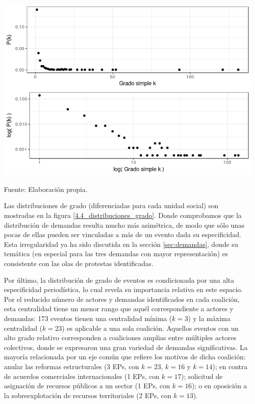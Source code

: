 \documentclass[letterpaper, 11pt]{book}
\theoremstyle{definition}
\theoremstyle{remark}
\begin{document}
\begin{minipage}{\linewidth}
\centering
{} \label{4.3_grado_actores}
\hspace{-1em}\includegraphics[scale=0.75]{img/4.3_grado_actores.png}
\par
\small Fuente: Elaboración propia.
\end{minipage}\bigskip


Las distribuciones de grado (diferenciadas para cada unidad social) son mostradas en la figura \ref{4.4_distribuciones_grado}. 
Donde comprobamos que la distribución de demandas resulta mucho más asimétrica, de modo que sólo unas pocas de ellas pueden ser vinculadas a más de un evento dada su especificidad. 
Esta irregularidad ya ha sido discutida en la sección \ref{sec:demandas}, donde su temática (en especial para las tres demandas con mayor representación) es consistente con las olas de protestas identificadas. 


Por último, la distribución de grado de eventos es condicionada por una alta especificidad periodística, lo cual revela su importancia relativa en este espacio. 
Por el reducido número de actores y demandas identificados en cada coalición, esta centralidad tiene un menor rango que aquél correspondiente a actores y demandas: 173 eventos tienen una centralidad mínima ($k=3$) y la máxima centralidad ($k=23$) es aplicable a una sola coalición. 
Aquellos eventos con un alto grado relativo corresponden a coaliciones amplias entre múltiples actores colectivos, donde se expresaron una gran variedad de demandas significativas. 
La mayoría relacionada por un eje común que refiere los motivos de dicha coalición: 
anular las reformas estructurales (3 EPs, con $k=23$, $k=16$ y $k=14$); 
en contra de acuerdos comerciales internacionales (1 EPs, con $k=17$); 
solicitud de asignación de recursos públicos a un sector (1 EPs, con $k=16$); 
o en oposición a la sobreexplotación de recursos territoriales (2 EPs, con $k=13$). 
\end{document}

